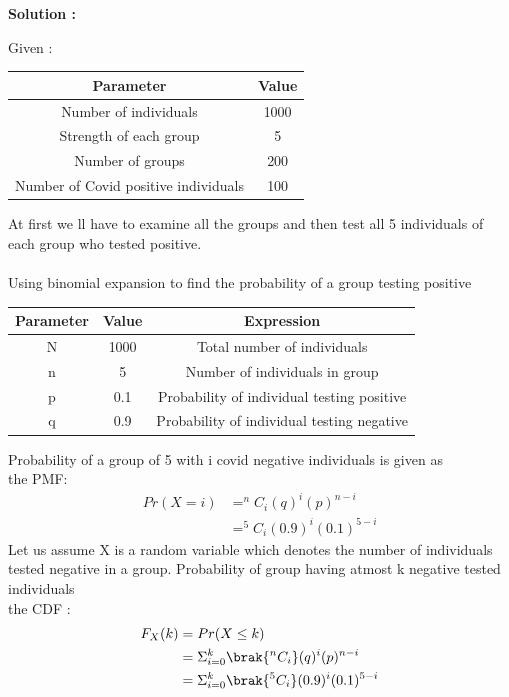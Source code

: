 \documentclass[journal,12pt,onecolumn]{IEEEtran}
\begin{document}
\textbf{Solution :}


Given : \\
\begin{table}[H]
\def\arraystretch{1.2}
\begin{tabular}{|c|c|}
\hline
	\textbf{Parameter} &\textbf{Value} \\ \hline
	Number of individuals &1000 \\ \hline
	Strength of each group &5 \\ 
	\hline
	Number of groups &200 \\ 
	\hline
	Number of Covid positive individuals &100 \\ \hline
	
	
\end{tabular}
\end{table}
At first we ll have to examine all the groups and then test all 5 individuals of each group who tested positive.\\ \\
Using binomial expansion to find the probability of a group testing positive \\
\begin{table}[H]
\def\arraystretch{1.2}
\begin{tabular}{|c|c|c|}
\hline
	\textbf{Parameter} &\textbf{Value} &\textbf{Expression} \\ \hline
	N &1000 &Total number of individuals \\ \hline
	n &5 &Number of individuals in group \\ \hline
	p &0.1 &Probability of individual testing positive \\ \hline
	q &0.9 &Probability of individual testing negative \\ \hline	
\end{tabular}
\end{table}
Probability of a group of 5 with i covid negative individuals is given as \\
the PMF:
\begin{align}
Pr(X=i) &= ^{n}C_{i}(q)^{i}(p)^{n-i} \\
&= ^{5}C_{i}(0.9)^{i}(0.1)^{5-i}
\end{align}
Let us assume X is a random variable which denotes the number of individuals tested negative in a group.
Probability of group having atmost k negative tested individuals \\
the CDF :
\begin{align}
F_{X}(k) &= Pr(X \le k) \\
&= \Sigma_{i=0}^k \brak{^{n}C_{i}}(q)^{i}(p)^{n-i} \\
&= \Sigma_{i=0}^k \brak{^{5}C_{i}}(0.9)^{i}(0.1)^{5-i} \\
\end{align}
\end{document}
